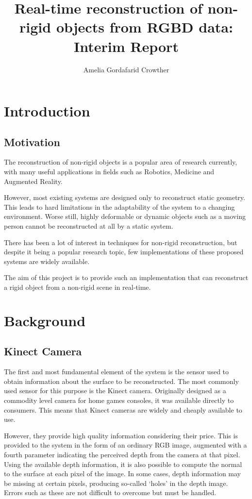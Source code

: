 \documentclass[a4paper]{article}
\title{Real-time reconstruction of non-rigid objects from RGBD data: Interim Report}
\author{Amelia Gordafarid Crowther}
\begin{document}
\maketitle
\section{Introduction}

\subsection{Motivation}

The reconstruction of non-rigid objects is a popular area of research currently, with many useful applications in fields such as Robotics, Medicine and Augmented Reality. 

However, most existing systems are designed only to reconstruct static geometry. This leads to hard limitations in the adaptability of the system to a changing environment. Worse still, highly deformable or dynamic objects such as a moving person cannot be reconstructed at all by a static system.

There has been a lot of interest in techniques for non-rigid reconstruction, but despite it being a popular research topic, few  implementations of these proposed systems are widely available. 

The aim of this project is to provide such an implementation that can reconstruct a rigid object from a  non-rigid scene in real-time.


\section{Background}

\subsection{Kinect Camera}

The first and most fundamental element of the system is the sensor used to obtain information about the surface to be reconstructed. The most commonly used sensor for this purpose is the Kinect camera. Originally designed as a commodity level camera for home games consoles, it was available directly to consumers. This means that Kinect cameras are widely and cheaply available to use.

However, they provide high quality information considering their price. This is provided to the system in the form of an ordinary RGB image, augmented with a fourth parameter indicating the perceived depth from the camera at that pixel. Using the available depth information, it is also possible to compute the normal to the surface at each pixel of the image. In some cases, depth information may be missing at certain pixels, producing so-called `holes' in the depth image. Errors such as these are not difficult to overcome but must be handled.
\end{document}
